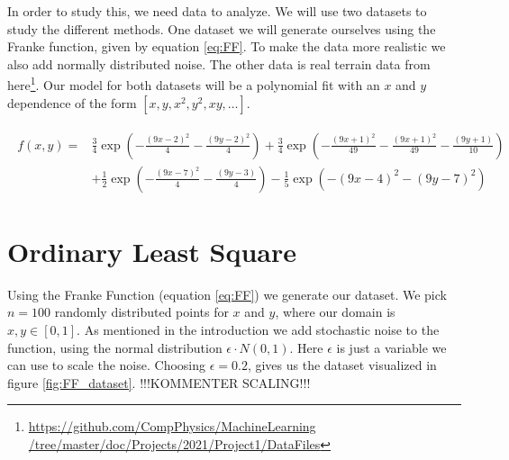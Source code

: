 \documentclass[reprint,english,notitlepage,aps,nobalancelastpage,nofootinbib]{revtex4-1}  %
\begin{document}
In order to study this, we need data to analyze. We will use two datasets to study the different methods. One dataset we will generate ourselves using the Franke function, given by equation \eqref{eq:FF}. To make the data more realistic we also add normally distributed noise. The other data is real terrain data from here\footnote{\href{https://github.com/CompPhysics/MachineLearning/tree/master/doc/Projects/2021/Project1/DataFiles}{https://github.com/CompPhysics/MachineLearning
/tree/master/doc/Projects/2021/Project1/DataFiles}}. Our model for both datasets will be a polynomial fit with an $x$ and $y$ dependence of the form $[x,y,x^2,y^2,xy,\dots]$.

\begin{align}
\begin{split}
\label{eq:FF}
f(x,y) = &\frac{3}{4}\exp(-\frac{(9x -2)^2}{4} - \frac{(9y-2)^2}{4}) + \frac{3}{4}\exp(-\frac{(9x + 1)^2}{49} - \frac{(9x + 1)^2}{49} - \frac{(9y + 1)}{10}) \\
& + \frac{1}{2}\exp(-\frac{(9x-7)^2}{4} - \frac{(9y -3)}{4}) - \frac{1}{5}\exp(-(9x-4)^2 - (9y-7)^2)
\end{split}
\end{align}


\section{Ordinary Least Square}

Using the Franke Function (equation \eqref{eq:FF}) we generate our dataset. We pick $n = 100$ randomly distributed points for $x$ and $y$, where our domain is $x,y\in[0,1]$. As mentioned in the introduction we add stochastic noise to the function, using the normal distribution $\epsilon \cdot N(0,1)$. Here $\epsilon$ is just a variable we can use to scale the noise. Choosing $\epsilon = 0.2$, gives us the dataset visualized in figure \ref{fig:FF_dataset}. !!!KOMMENTER SCALING!!!
\end{document}
